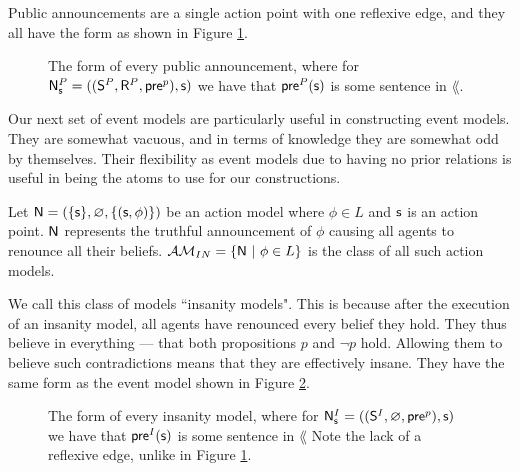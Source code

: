 Public announcements are a single action point with one reflexive edge, and they all have the form
as shown in Figure \ref{figure:exampleAnnounce}.

\begin{figure}
\centering
{}
\caption{The form of every public announcement, where for $\mathrm{\mathsf{N}}^P_\mathrm{\mathsf{s}} =
((\mathrm{\mathsf{S}}^P,\mathrm{\mathsf{R}}^P,\mathrm{\mathsf{pre}}^p),\mathrm{\mathsf{s}})$ we have that $\mathrm{\mathsf{pre}}^P(\mathrm{\mathsf{s}})$ is some sentence in $\lang$.}
\label{figure:exampleAnnounce}
\end{figure}

Our next set of event models are particularly useful in constructing event models.
They are somewhat vacuous, and in terms of knowledge they are somewhat odd by themselves.
Their flexibility as event models due to having no prior relations is useful in being the atoms to
use for our constructions.

\begin{defn} \label{insanity}
Let $\mathrm{\mathsf{\mathrm{\mathsf{N}} = (\{ s \}, \varnothing, \{(s, \phi)\})}}$ be an action model
where $\phi \in L$ and $\mathrm{\mathsf{s}}$ is an action point.
$\mathrm{\mathsf{\mathrm{\mathsf{N}}}}$ represents the truthful announcement of $\phi$ causing all agents to renounce all their beliefs.
$\mathcal{AM}_{IN} = \{\mathrm{\mathsf{\mathrm{\mathsf{N}}}} \text{ } | \text{ } \phi \in L\}$ is the class of all such action models.
\end{defn}

We call this class of models ``insanity models".
This is because after the execution of an insanity model, all agents have renounced every belief
they hold.
They thus believe in everything --- that both propositions $p$ and $\neg p$ hold.
Allowing them to believe such contradictions means that they are effectively insane.
They have the same form as the event model shown in Figure \ref{figure:exampleInsane}.

\begin{figure}
\centering
{}
\caption{The form of every insanity model, where for $\mathrm{\mathsf{N}}^I_\mathrm{\mathsf{s}} =
((\mathrm{\mathsf{S}}^I,\varnothing,\mathrm{\mathsf{pre}}^p),\mathrm{\mathsf{s}})$ we have that $\mathrm{\mathsf{pre}}^I(\mathrm{\mathsf{s}})$ is some sentence in $\lang$
Note the lack of a reflexive edge, unlike in Figure \ref{figure:exampleAnnounce}.}
\label{figure:exampleInsane}
\end{figure}

